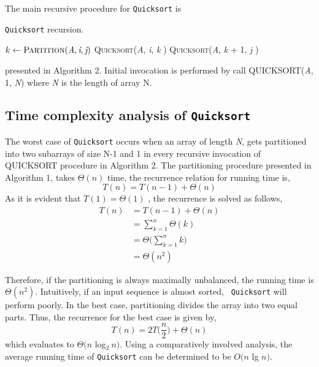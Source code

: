 \documentclass[a4paper, 10pt,twocolumn]{article}
\begin{document}
The main recursive procedure for \texttt{Quicksort} is
\begin{algorithm}
  \caption{\texttt{Quicksort} recursion.}
  \label{algo:quick_rec}
  \begin{algorithmic}[1]
     \newline
            \State $k \leftarrow \textsc{Partition}(\textit{A}, \textit{i}, \textit{j} ) $
            \State \textsc{Quicksort}(\textit{A}, \textit{i}, \textit{k} )
            \State \textsc{Quicksort}(\textit{A}, \textit{k} + 1, \textit{j} )
         \EndIf
     \EndProcedure
  \end{algorithmic}
\end{algorithm}


\noindent presented in Algorithm 2. Initial invocation is performed by call QUICKSORT(\textit{A}, 1, \textit{N}) where \textit{N} is the length of array N.

\subsection{ Time complexity analysis of \texttt{Quicksort}}
The worst case of \texttt{Quicksort} occurs when an array of length \textit{N}, gets partitioned into two subarrays of size N-1 and 1 in every recursive invocation of QUICKSORT procedure in Algorithm 2. The partitioning procedure presented in Algorithm 1, takes $\Theta(n)$ time, the recurrence relation for running time is,
\begin{equation*}
    T(n) = T(n-1) + \Theta(n)
\end{equation*}
As it is evident that $ T(1) = \Theta(1)$ , the recurrence is
solved as follows,
\begin{align*}
    T(n)&= T(n − 1) + \Theta(n)\\
        &=\sum_{k=1}^{n}\Theta(k)\\
        &=\Theta\Bigg(\sum_{k=1}^{n}k\Bigg)\\
        &=\Theta(n^2)
\end{align*}

Therefore, if the partitioning is always maximally
unbalanced, the running time is $\Theta(n^2) $. Intuitively, if an input sequence is almost sorted, \texttt{ Quicksort} will perform poorly. In the best case, partitioning divides the array into two equal parts. Thus, the recurrence for the best case is given by,
\begin{equation*}
    T(n) = 2T\bigg(\frac{n}{2}\bigg) + \Theta(n)
\end{equation*}
which evaluates to $\Theta(n$ log$_2\ n) $. Using a comparatively involved analysis, the average running time of \texttt{Quicksort} can be determined to be $O(n$ lg $n)$.\
\end{document}
